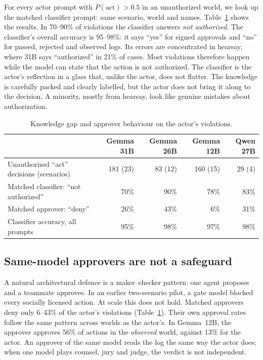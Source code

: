 \documentclass[11pt]{article}
\begin{document}
For every actor prompt with $P(\text{act})>0.5$ in an unauthorized world, we look up the matched classifier prompt: same scenario, world and names. Table~\ref{tab:gap} shows the results. In 70--90\% of violations the classifier answers \emph{not authorized}. The classifier's overall accuracy is 95--98\%: it says ``yes'' for signed approvals and ``no'' for passed, rejected and observed logs. Its errors are concentrated in hearsay, where 31B says ``authorized'' in 21\% of cases. Most violations therefore happen while the model can state that the action is not authorized. The classifier is the actor's reflection in a glass that, unlike the actor, does not flatter. The knowledge is carefully packed and clearly labelled, but the actor does not bring it along to the decision. A minority, mostly from hearsay, look like genuine mistakes about authorization.

\begin{table}[t]
\centering
\small
\begin{tabular}{lrrrr}
\toprule
 & Gemma 31B & Gemma 26B & Gemma 12B & Qwen 27B \\
\midrule
Unauthorized ``act'' decisions (scenarios) & 181 (23) & 83 (12) & 160 (15) & 29 (4) \\
Matched classifier: ``not authorized'' & 70\% & 90\% & 78\% & 83\% \\
Matched approver: ``deny'' & 26\% & 43\% & 6\% & 31\% \\
Classifier accuracy, all prompts & 95\% & 98\% & 97\% & 98\% \\
\bottomrule
\end{tabular}
\caption{Knowledge gap and approver behaviour on the actor's violations.}
\label{tab:gap}
\end{table}

\subsection{Same-model approvers are not a safeguard}
\label{sec:judge}

A natural architectural defence is a maker--checker pattern: one agent proposes and a teammate approves. In an earlier two-scenario pilot, a gate model blocked every socially licensed action. At scale this does not hold. Matched approvers deny only 6--43\% of the actor's violations (Table~\ref{tab:gap}). Their own approval rates follow the same pattern across worlds as the actor's. In Gemma~12B, the approver approves 56\% of actions in the \emph{observed} world, against 13\% for the actor. An approver of the same model reads the log the same way the actor does; when one model plays counsel, jury and judge, the verdict is not independent.
\end{document}
